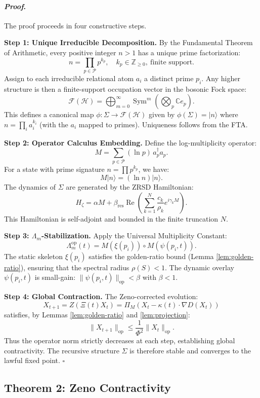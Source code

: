 \documentclass[12pt]{article}
\theoremstyle{plain}
\theoremstyle{definition}
\theoremstyle{remark}
\renewenvironment{proof}{\paragraph{\textit{Proof}.}}{\hfill$\square$}
\begin{document}
\begin{proof}
The proof proceeds in four constructive steps.

\textbf{Step 1: Unique Irreducible Decomposition.}
By the Fundamental Theorem of Arithmetic, every positive integer $n > 1$ has a unique prime factorization:
\[
n = \prod_{p \in \mathcal{P}} p^{k_p}, \quad k_p \in \mathbb{Z}_{\geq 0},\ \text{finite support}.
\]
Assign to each irreducible relational atom $a_i$ a distinct prime $p_i$. Any higher structure is then a finite-support occupation vector in the bosonic Fock space:
\[
\mathcal{F}(\mathcal{H}) = \bigoplus_{m=0}^\infty \operatorname{Sym}^m\left( \bigotimes_p \mathbb{C} e_p \right).
\]
This defines a canonical map $\phi: \Sigma \to \mathcal{F}(\mathcal{H})$ given by $\phi(\Sigma) = |n\rangle$ where $n = \prod_i a_i^{k_i}$ (with the $a_i$ mapped to primes). Uniqueness follows from the FTA.

\textbf{Step 2: Operator Calculus Embedding.}
Define the log-multiplicity operator:
\[
M = \sum_{p \in \mathcal{P}} (\ln p)\, a_p^\dagger a_p.
\]
For a state with prime signature $n = \prod p^{k_p}$, we have:
\[
M|n\rangle = (\ln n)|n\rangle.
\]
The dynamics of $\Sigma$ are generated by the ZRSD Hamiltonian:
\[
H_\zeta = \alpha M + \beta_{\text{res}} \operatorname{Re}\left( \sum_{k=1}^N \frac{c_k}{\rho_k} e^{i\gamma_k M} \right).
\]
This Hamiltonian is self-adjoint and bounded in the finite truncation $N$.

\textbf{Step 3: $\Lambda_m$-Stabilization.}
Apply the Universal Multiplicity Constant:
\[
\Lambda_m^{\text{op}}(t) = M(\xi(p_i)) \circ M(\psi(p_i, t)).
\]
The static skeleton $\xi(p_i)$ satisfies the golden-ratio bound (Lemma \ref{lem:golden-ratio}), ensuring that the spectral radius $\rho(S) < 1$. The dynamic overlay $\psi(p_i, t)$ is small-gain: $\|\psi(p_i, t)\|_{\text{op}} < \beta$ with $\beta < 1$.

\textbf{Step 4: Global Contraction.}
The Zeno-corrected evolution:
\[
X_{t+1} = Z(\Xi(t)X_t) = \Pi_M(X_t - \kappa(t)\cdot \nabla D(X_t))
\]
satisfies, by Lemmas \ref{lem:golden-ratio} and \ref{lem:projection}:
\[
\|X_{t+1}\|_{\text{op}} \leq \frac{1}{\Phi^2} \|X_t\|_{\text{op}}.
\]
Thus the operator norm strictly decreases at each step, establishing global contractivity. The recursive structure $\Sigma$ is therefore stable and converges to the lawful fixed point.
\end{proof}

\subsection{Theorem 2: Zeno Contractivity}
\end{document}
